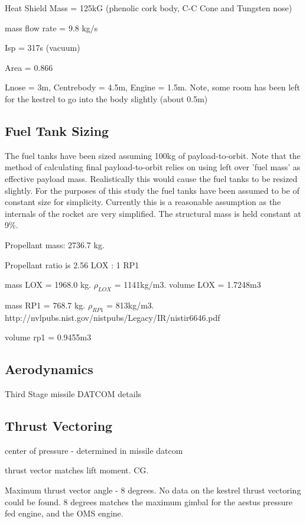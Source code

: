 	
	Heat Shield Mass = 125kG (phenolic cork body, C-C Cone and Tungsten nose)
	
	mass flow rate = 9.8 kg/s
	
	Isp = 317s (vacuum)
	
	Area = 0.866
	
	Lnose = 3m, Centrebody = 4.5m, Engine = 1.5m. Note, some room has been left for the kestrel to go into the body slightly (about 0.5m)
		
		\subsection{Fuel Tank Sizing}
		The fuel tanks have been sized assuming 100kg of payload-to-orbit. Note that the method of calculating final payload-to-orbit relies on using left over 'fuel mass' as effective payload mass. Realistically this would cause the fuel tanks to be resized slightly. For the purposes of this study the fuel tanks have been assumed to be of constant size for simplicity. Currently this is a reasonable assumption as the internals of the rocket are very simplified. The structural mass is held constant at 9\%. 
		

		
		Propellant mass: 2736.7 kg.
		
		Propellant ratio is 2.56 LOX : 1 RP1
		
		mass LOX = 1968.0 kg.
		$\rho_{LOX}$ = 1141kg/m3.
		volume LOX = 1.7248m3
		
		
		mass RP1 = 768.7 kg.
		$\rho_{RP1}$ = 813kg/m3.
		http://nvlpubs.nist.gov/nistpubs/Legacy/IR/nistir6646.pdf
		
		volume rp1 = 0.9455m3
		
		
		
		
		
		
		\subsection{Aerodynamics}
		Third Stage missile DATCOM details
		
		\subsection{Thrust Vectoring}
		center of pressure - determined in missile datcom
		
		thrust vector matches lift moment. CG.
		
		Maximum thrust vector angle - 8 degrees. No data on the kestrel thrust vectoring could be found. 8 degrees matches the maximum gimbal for the aestus pressure fed engine, and the OMS engine. 
		
